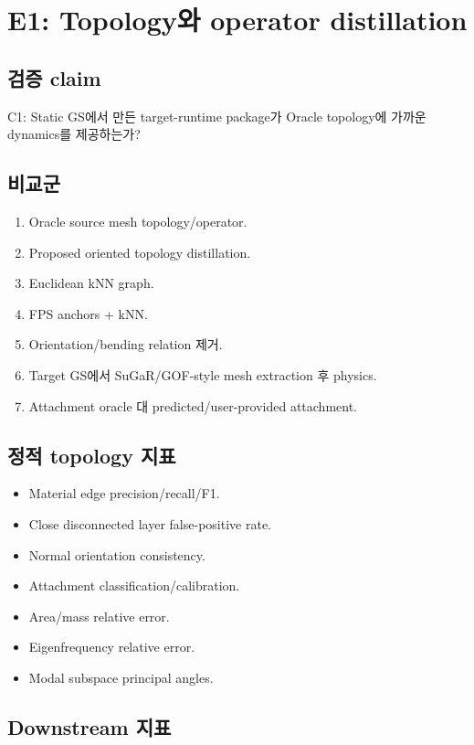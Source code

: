 \documentclass[11pt,a4paper]{article}
\begin{document}
\section{E1: Topology와 operator distillation}

\subsection*{검증 claim}

C1: Static GS에서 만든 target-runtime package가 Oracle topology에 가까운 dynamics를 제공하는가?

\subsection*{비교군}

\begin{enumerate}[leftmargin=1.7em]
  \item Oracle source mesh topology/operator.
  \item Proposed oriented topology distillation.
  \item Euclidean kNN graph.
  \item FPS anchors + kNN.
  \item Orientation/bending relation 제거.
  \item Target GS에서 SuGaR/GOF-style mesh extraction 후 physics.
  \item Attachment oracle 대 predicted/user-provided attachment.
\end{enumerate}

\subsection*{정적 topology 지표}

\begin{itemize}[leftmargin=1.5em]
  \item Material edge precision/recall/F1.
  \item Close disconnected layer false-positive rate.
  \item Normal orientation consistency.
  \item Attachment classification/calibration.
  \item Area/mass relative error.
  \item Eigenfrequency relative error.
  \item Modal subspace principal angles.
\end{itemize}

\subsection*{Downstream 지표}
\end{document}
